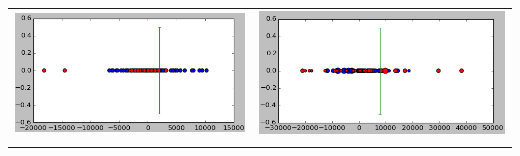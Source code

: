 \documentclass[11pt]{article}
\begin{document}
\begin{tabular}{ll}
\includegraphics[scale=0.380]{res/left.png}
& 
\includegraphics[scale=0.370]{res/right.jpg}
\\
\label{reweighting}
\end{tabular}
\end{document}

